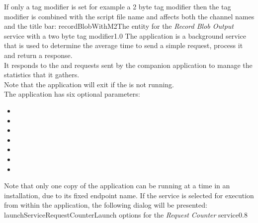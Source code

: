 If only a tag modifier is set \longDash{} for example a 2 byte tag modifier \longDash{}
then the tag modifier is combined with the script file name and affects both the channel
names and the title bar:
%
{recordBlobWithM2}{The \emph{\MMMU} entity for the \emph{Record Blob Output} service with
a two byte tag modifier}{1.0}
\condPage
{}
The  application is a background service that is
used to determine the average time to send a simple request, process it and return a
response.\\

It responds to the  and
 requests sent by the
companion application  to manage the statistics
that it gathers.\\

Note that the application will exit if the  is not
running.\\

The application has six optional parameters:
\begin{itemize}
\item{}
\item\exSp{}
\item\exSp{}
\item\exSp{}
\item\exSp{}
\item\exSp{}
\item\exSp{}
\end{itemize}
Note that only one copy of the  application can be
running at a time in an \mplusm{} installation, due to its fixed endpoint name.
\condPage
If the service is selected for execution from within the \emph{\MMMU} application, the
following dialog will be presented:
%
{launchServiceRequestCounter}{Launch options for the \emph{Request Counter} service}{0.8}

